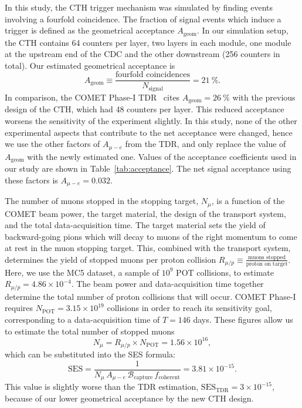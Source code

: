 In this study, the CTH trigger mechanism was simulated by finding events
involving a fourfold coincidence. The fraction of signal events which induce a
trigger is defined as the geometrical acceptance $A_\mathrm{geom}$. In our
simulation setup, the CTH contains 64 counters per layer, two layers
in each module, one module at the upstream end of the CDC and the other
downstream (256 counters in total). Our estimated geometrical acceptance is
$$
A_\mathrm{geom} \equiv \frac{\text{fourfold coincidences}}{N_\mathrm{signal}} = \SI{21}{\percent}.
$$
In comparison, the COMET Phase-I TDR~\cite{the_comet_collaboration_comet_2020}
cites $A_\mathrm{geom} = \SI{26}{\percent}$ with the previous design of the CTH,
which had 48 counters per layer. This reduced acceptance worsens the sensitivity
of the experiment slightly. In this study, none of the other experimental
aspects that contribute to the net acceptance were changed, hence we use the
other factors of $A_{\mu-e}$ from the TDR, and only replace the value of
$A_\mathrm{geom}$ with the newly estimated one. Values of the acceptance
coefficients used in our study are shown in Table~\ref{tab:acceptance}. The net
signal acceptance using these factors is $A_{\mu-e} = 0.032$.

The number of muons stopped in the stopping target, $N_\mu$, is a function of
the COMET beam power, the target material, the design of the
transport system, and the total data-acquisition time. 
The target material sets the yield of
backward-going pions which will decay to muons of the right momentum to come at
rest in the muon stopping target. This, combined with the transport system,
determines the yield of stopped muons per proton collision $R_{\mu/p} \equiv
\frac{\text{muons stopped}}{\text{proton on target}}$. Here, we use the
MC5 dataset, a sample of $10^9$ POT collisions, to estimate $R_{\mu/p}=4.86
\times 10^{-4}$.
The beam power and data-acquisition time together determine the total number of proton
collisions that will occur. COMET Phase-I requires $N_\mathrm{POT} = 3.15 \times
10^{19}$ collisions in order to reach its sensitivity goal, corresponding to a
data-acquisition time of $T=146$ days.
These figures allow us to estimate the total number of stopped muons
$$N_\mu = R_{\mu/p} \times N_\mathrm{POT} = 1.56\times 10^{16},$$
which can be substituted into the SES formula:
\begin{equation}\label{eq:my_ses}
\mathrm{SES}
=\frac{1}{N_\mu\,A_{\mu-e}\,\mathcal{B}_\mathrm{capture}\,f_\mathrm{coherent}}
= 3.81\times10^{-15}.
\end{equation}
This value is slightly worse than the TDR estimation,
$\mathrm{SES}_\mathrm{TDR}=3\times 10^{-15}$, because of our lower geometrical
acceptance by the new CTH design.

